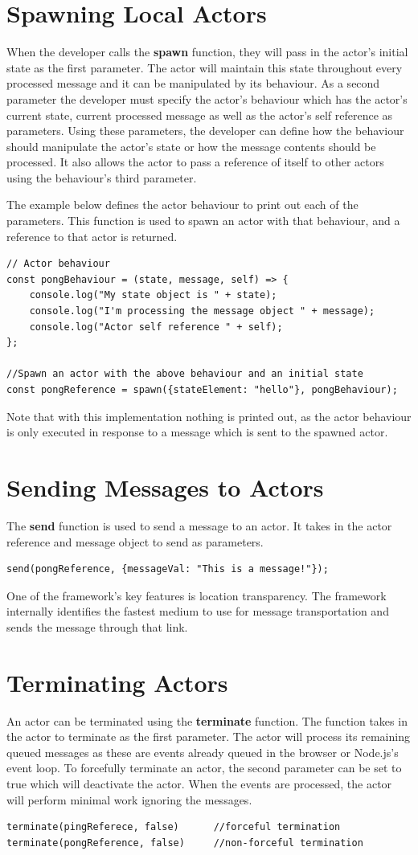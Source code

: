 \documentclass[12pt, a4paper]{report}
\theoremstyle{definition}
\theoremstyle{definition}%
\theoremstyle{definition}%
\theoremstyle{definition}%
\theoremstyle{definition}%
\theoremstyle{definition}%
\begin{document}
\section{Spawning Local Actors}
When the developer calls the \textbf{spawn} function, they will pass in the actor's initial state as the first parameter. The actor will maintain this state throughout every processed message and it can be manipulated by its behaviour. As a second parameter the developer must specify the actor's behaviour which has the actor's current state, current processed message as well as the actor's self reference as parameters. Using these parameters, the developer can define how the behaviour should manipulate the actor's state or how the message contents should be processed. It also allows the actor to pass a reference of itself to other actors using the behaviour's third parameter.

The example below defines the actor behaviour to print out each of the parameters. This function is used to spawn an actor with that behaviour, and a reference to that actor is returned.
\begin{lstlisting}
// Actor behaviour
const pongBehaviour = (state, message, self) => {
    console.log("My state object is " + state);
    console.log("I'm processing the message object " + message);
    console.log("Actor self reference " + self);
};

//Spawn an actor with the above behaviour and an initial state
const pongReference = spawn({stateElement: "hello"}, pongBehaviour);
\end{lstlisting}
Note that with this implementation nothing is printed out, as the actor behaviour is only executed in response to a message which is sent to the spawned actor.
\section{Sending Messages to Actors}
The \textbf{send} function is used to send a message to an actor. It takes in the actor reference and message object to send as parameters.
\begin{lstlisting}
send(pongReference, {messageVal: "This is a message!"});
\end{lstlisting}
One of the framework's key features is location transparency. The framework internally identifies the fastest medium to use for message transportation and sends the message through that link.
\section{Terminating Actors}
An actor can be terminated using the \textbf{terminate} function. The function takes in the actor to terminate as the first parameter. The actor will process its remaining queued messages as these are events already queued in the browser or Node.js's event loop. To forcefully terminate an actor, the second parameter can be set to true which will deactivate the actor. When the events are processed, the actor will perform minimal work ignoring the messages.
\begin{lstlisting}
terminate(pingReferece, false)      //forceful termination
terminate(pongReference, false)     //non-forceful termination
\end{lstlisting}
\end{document}
